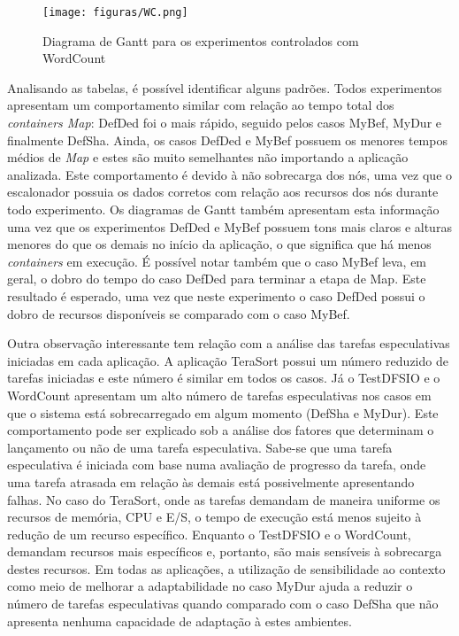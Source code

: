 \begin{figure}[!ht]
	\centering
	\texttt{[image: figuras/WC.png]}
	\caption{Diagrama de Gantt para os experimentos controlados com WordCount}
	\label{fig:exp1WC}
\end{figure}

Analisando as tabelas, é possível identificar alguns padrões. Todos experimentos apresentam um comportamento similar com relação ao tempo total dos \textit{containers Map}: DefDed foi o mais rápido, seguido pelos casos MyBef, MyDur e finalmente DefSha. Ainda, os casos DefDed e MyBef possuem os menores tempos médios de \textit{Map} e estes são muito semelhantes não importando a aplicação analizada. Este comportamento é devido à não sobrecarga dos nós, uma vez que o escalonador possuia os dados corretos com relação aos recursos dos nós durante todo experimento.
Os diagramas de Gantt também apresentam esta informação uma vez que os experimentos DefDed e MyBef possuem tons mais claros e alturas menores do que os demais no início da aplicação, o que significa que há menos \textit{containers} em execução. É possível notar também que o caso MyBef leva, em geral, o dobro do tempo do caso DefDed para terminar a etapa de Map. Este resultado é esperado, uma vez que neste experimento o caso DefDed possui o dobro de recursos disponíveis se comparado com o caso MyBef. 

Outra observação interessante tem relação com a análise das tarefas especulativas iniciadas em cada aplicação. A aplicação TeraSort possui um número reduzido de tarefas iniciadas e este número é similar em todos os casos. Já o TestDFSIO e o WordCount apresentam um alto número de tarefas especulativas nos casos em que o sistema está sobrecarregado em algum momento (DefSha e MyDur). Este comportamento pode ser explicado sob a análise dos fatores que determinam o lançamento ou não de uma tarefa especulativa. Sabe-se que uma tarefa especulativa é iniciada com base numa avaliação de progresso da tarefa, onde uma tarefa atrasada em relação às demais está possivelmente apresentando falhas. No caso do TeraSort, onde as tarefas demandam de maneira uniforme os recursos de memória, CPU e E/S, o tempo de execução está menos sujeito à redução de um recurso específico. Enquanto o TestDFSIO e o WordCount, demandam recursos mais específicos e, portanto, são mais sensíveis à sobrecarga destes recursos. Em todas as aplicações, a utilização de sensibilidade ao contexto como meio de melhorar a adaptabilidade no caso MyDur ajuda a reduzir o número de tarefas especulativas quando comparado com o caso DefSha que não apresenta nenhuma capacidade de adaptação à estes ambientes.

